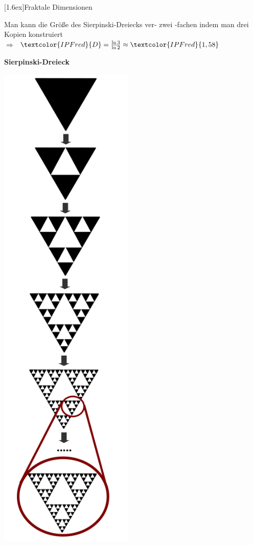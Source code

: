 \documentclass[final]{beamer}
\newlength{\columnheight}
\newlength{\marginw}
\newlength{\tw}
\newlength{\colw}
\newenvironment{myTwoColPoster}{%
  \begin{minipage}[t]{\textwidth}%
    \hspace*{\marginw}%
    \hspace*{9.5bp}%
    \begin{minipage}[t]{\tw}}%
  {\end{minipage}%
   \hspace*{\marginw}%
   \end{minipage}}
\newenvironment{myCol}%
    {\begin{minipage}[t][\columnheight][t]{\colw}}%
    {\end{minipage}}
\newenvironment{textblock}[1]%
    {\begin{block}{\rule[-0.6ex]{0pt}{2.4ex}\raisebox{-0.25ex}[1.6ex]{#1}}%
     \vspace*{5mm}}%
    {\vspace*{5mm}\end{block}}
\begin{document}
\begin{frame}[t]{}
\begin{myTwoColPoster}
\begin{myCol}
\begin{textblock}{Fraktale Dimensionen}
\begin{minipage}[c]{0.29\textwidth}
{    Man kann die Gr\"o\ss e des Sierpinski-Dreiecks ver-  \textcolor{IPFred}{zwei} -fachen indem man  \textcolor{IPFred}{drei} Kopien konstruiert\\
      \textcolor{IPFred}{\textbf{$\Rightarrow$}} $  \textcolor{IPFred}{D} =\frac{\ln 3}{\ln 2}\approx  \textcolor{IPFred}{1,58} $\vspace*{0cm}
    }
    \end{minipage}\hspace*{-2.2cm}
    \begin{minipage}[c]{0.21\textwidth}\vspace*{-6.5cm}
    \centerline{\textbf{ Sierpinski-Dreieck}}\vspace*{1cm}\hspace*{1.6cm}
    \includegraphics[width=0.48\textwidth]{fig/sierpinski2}
  \end{minipage}


\end{textblock}
\end{myCol}
\end{myTwoColPoster}
\end{frame}
\end{document}
